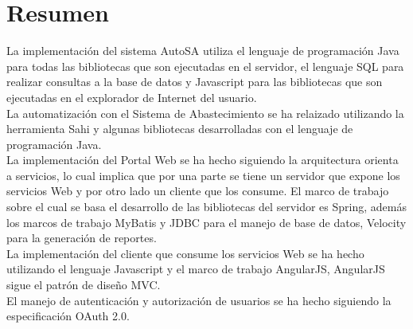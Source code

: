 %

\section{Resumen}
La implementación del sistema AutoSA utiliza el lenguaje de programación Java para todas las bibliotecas que son ejecutadas en el servidor, el lenguaje SQL para realizar consultas a la base de datos y Javascript para las bibliotecas que son ejecutadas en el explorador de Internet del usuario.\\
La automatización con el Sistema de Abastecimiento se ha relaizado utilizando la herramienta Sahi y algunas bibliotecas desarrolladas con el lenguaje de programación Java.\\
La implementación del Portal Web se ha hecho siguiendo la arquitectura orienta a servicios, lo cual implica que por una parte se tiene un servidor que expone los servicios Web y por otro lado un cliente que los consume. El marco de trabajo sobre el cual se basa el desarrollo de las bibliotecas del servidor es Spring, además los marcos de trabajo MyBatis y JDBC para el manejo de base de datos, Velocity para la generación de reportes.\\
La implementación del cliente que consume los servicios Web se ha hecho utilizando el lenguaje Javascript y el marco de trabajo AngularJS, AngularJS sigue el patrón de diseño MVC.\\
El manejo de autenticación y autorización de usuarios se ha hecho siguiendo la especificación OAuth 2.0.
